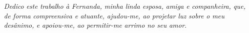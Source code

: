 







\begin{dedicatoria}
    \vspace*{\fill}
    \begin{flushright}
	\begin{minipage}{.5\textwidth}
\textit{%
Dedico este trabalho à Fernanda, minha linda esposa, amiga e companheira, que, de forma compreensiva e atuante, ajudou-me, ao projetar luz sobre o meu desânimo, e apoiou-me, ao permitir-me arrimo no seu amor.
}%
    \end{minipage}
    \end{flushright}
\end{dedicatoria}
